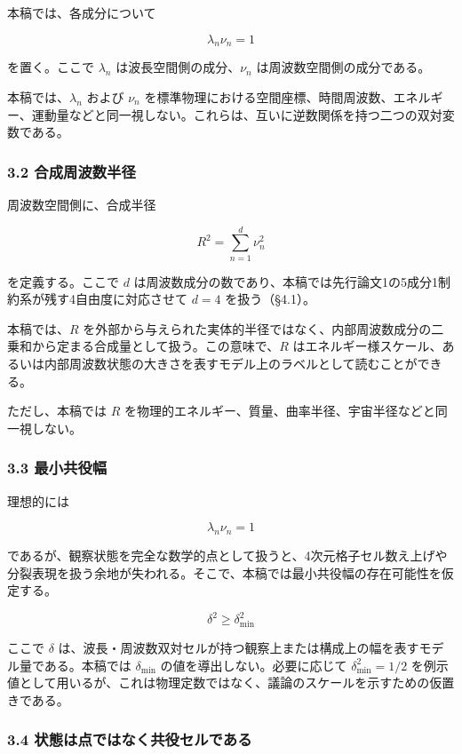 \documentclass[
]{ltjsarticle}
\begin{document}
本稿では、各成分について

\[
\lambda_n\nu_n=1
\]

を置く。ここで \(\lambda_n\) は波長空間側の成分、\(\nu_n\)
は周波数空間側の成分である。

本稿では、\(\lambda_n\) および \(\nu_n\)
を標準物理における空間座標、時間周波数、エネルギー、運動量などと同一視しない。これらは、互いに逆数関係を持つ二つの双対変数である。

\subsubsection{3.2
合成周波数半径}\label{ux5408ux6210ux5468ux6ce2ux6570ux534aux5f84}

周波数空間側に、合成半径

\[
R^2=\sum_{n=1}^{d}\nu_n^2
\]

を定義する。ここで \(d\)
は周波数成分の数であり、本稿では先行論文1の5成分1制約系が残す4自由度に対応させて
\(d=4\) を扱う（§4.1）。

本稿では、\(R\)
を外部から与えられた実体的半径ではなく、内部周波数成分の二乗和から定まる合成量として扱う。この意味で、\(R\)
はエネルギー様スケール、あるいは内部周波数状態の大きさを表すモデル上のラベルとして読むことができる。

ただし、本稿では \(R\)
を物理的エネルギー、質量、曲率半径、宇宙半径などと同一視しない。

\subsubsection{3.3 最小共役幅}\label{ux6700ux5c0fux5171ux5f79ux5e45}

理想的には

\[
\lambda_n\nu_n=1
\]

であるが、観察状態を完全な数学的点として扱うと、4次元格子セル数え上げや分裂表現を扱う余地が失われる。そこで、本稿では最小共役幅の存在可能性を仮定する。

\[
\delta^2\ge \delta_{\min}^2
\]

ここで \(\delta\)
は、波長・周波数双対セルが持つ観察上または構成上の幅を表すモデル量である。本稿では
\(\delta_{\min}\) の値を導出しない。必要に応じて \(\delta_{\min}^2=1/2\)
を例示値として用いるが、これは物理定数ではなく、議論のスケールを示すための仮置きである。

\subsubsection{3.4
状態は点ではなく共役セルである}\label{ux72b6ux614bux306fux70b9ux3067ux306fux306aux304fux5171ux5f79ux30bbux30ebux3067ux3042ux308b}
\end{document}
